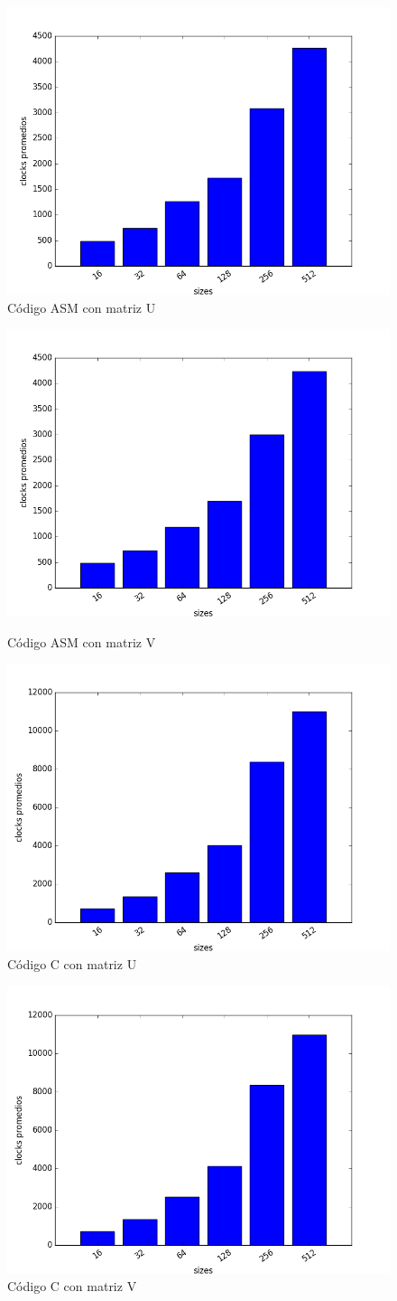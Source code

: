 \begin{figure}[h]
  \centering
  	\includegraphics[width=.6\linewidth]{ClocksASMU.png}
  	\caption{Código ASM con matriz U}
  	\label{fig:ASMU}
\end{figure}

\pagebreak

\begin{figure}[h]
  \centering
  	\includegraphics[width=.6\linewidth]{ClocksASMV.png}
  	\caption{Código ASM con matriz V}
  	\label{fig:ASMV}
  \centering
  	\includegraphics[width=.6\linewidth]{ClocksCU.png}
  	\caption{Código C con matriz U}
  	\label{fig:CU}
\end{figure}

\begin{figure}[h]
  \centering
  	\includegraphics[width=.6\linewidth]{ClocksCV.png}
  	\caption{Código C con matriz V}
  	\label{fig:CV}
\end{figure}

